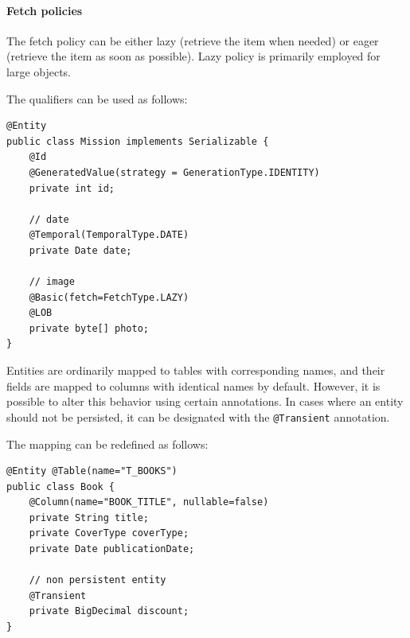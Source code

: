 \paragraph*{Fetch policies}
The fetch policy can be either lazy (retrieve the item when needed) or eager (retrieve the item as soon as possible). 
Lazy policy is primarily employed for large objects.
\begin{example}
    The qualifiers can be used as follows:
\begin{lstlisting}[style=Java]
@Entity
public class Mission implements Serializable {
    @Id
    @GeneratedValue(strategy = GenerationType.IDENTITY)
    private int id;

    // date
    @Temporal(TemporalType.DATE)
    private Date date;

    // image
    @Basic(fetch=FetchType.LAZY)
    @LOB
    private byte[] photo;
}
\end{lstlisting}
\end{example}
Entities are ordinarily mapped to tables with corresponding names, and their fields are mapped to columns with identical names by default. 
However, it is possible to alter this behavior using certain annotations. 
In cases where an entity should not be persisted, it can be designated with the \texttt{@Transient} annotation.
\begin{example}
    The mapping can be redefined as follows: 
\begin{lstlisting}[style=Java]
@Entity @Table(name="T_BOOKS")
public class Book {
    @Column(name="BOOK_TITLE", nullable=false)
    private String title;
    private CoverType coverType;
    private Date publicationDate;

    // non persistent entity
    @Transient
    private BigDecimal discount;
}
\end{lstlisting}
\end{example}

